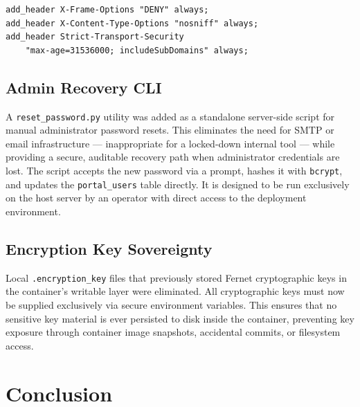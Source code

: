 \documentclass[12pt, a4paper]{article}
\begin{document}
\begin{lstlisting}[caption={Security headers in nginx.conf}]
add_header X-Frame-Options "DENY" always;
add_header X-Content-Type-Options "nosniff" always;
add_header Strict-Transport-Security
    "max-age=31536000; includeSubDomains" always;
\end{lstlisting}

\subsection{Admin Recovery CLI}

A \texttt{reset\_password.py} utility was added as a standalone server-side script for manual administrator password resets. This eliminates the need for SMTP or email infrastructure — inappropriate for a locked-down internal tool — while providing a secure, auditable recovery path when administrator credentials are lost. The script accepts the new password via a prompt, hashes it with \texttt{bcrypt}, and updates the \texttt{portal\_users} table directly. It is designed to be run exclusively on the host server by an operator with direct access to the deployment environment.

\subsection{Encryption Key Sovereignty}

Local \texttt{.encryption\_key} files that previously stored Fernet cryptographic keys in the container's writable layer were eliminated. All cryptographic keys must now be supplied exclusively via secure environment variables. This ensures that no sensitive key material is ever persisted to disk inside the container, preventing key exposure through container image snapshots, accidental commits, or filesystem access.


\section{Conclusion}
\end{document}
